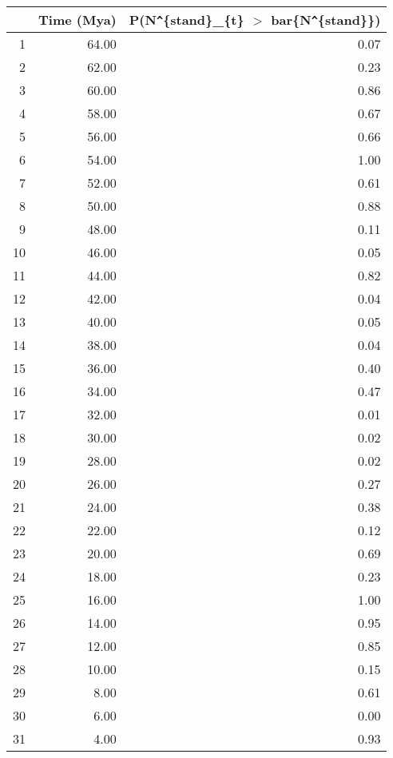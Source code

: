 \begin{table}[ht]
\centering
\begin{tabular}{rrr}
  \hline
 & Time (Mya) & P(N\verb|^|\{stand\}\_\{t\} $>$ bar\{N\verb|^|\{stand\}\}) \\ 
  \hline
1 & 64.00 & 0.07 \\ 
  2 & 62.00 & 0.23 \\ 
  3 & 60.00 & 0.86 \\ 
  4 & 58.00 & 0.67 \\ 
  5 & 56.00 & 0.66 \\ 
  6 & 54.00 & 1.00 \\ 
  7 & 52.00 & 0.61 \\ 
  8 & 50.00 & 0.88 \\ 
  9 & 48.00 & 0.11 \\ 
  10 & 46.00 & 0.05 \\ 
  11 & 44.00 & 0.82 \\ 
  12 & 42.00 & 0.04 \\ 
  13 & 40.00 & 0.05 \\ 
  14 & 38.00 & 0.04 \\ 
  15 & 36.00 & 0.40 \\ 
  16 & 34.00 & 0.47 \\ 
  17 & 32.00 & 0.01 \\ 
  18 & 30.00 & 0.02 \\ 
  19 & 28.00 & 0.02 \\ 
  20 & 26.00 & 0.27 \\ 
  21 & 24.00 & 0.38 \\ 
  22 & 22.00 & 0.12 \\ 
  23 & 20.00 & 0.69 \\ 
  24 & 18.00 & 0.23 \\ 
  25 & 16.00 & 1.00 \\ 
  26 & 14.00 & 0.95 \\ 
  27 & 12.00 & 0.85 \\ 
  28 & 10.00 & 0.15 \\ 
  29 & 8.00 & 0.61 \\ 
  30 & 6.00 & 0.00 \\ 
  31 & 4.00 & 0.93 \\ 
   \hline
\end{tabular}
\label{tab:div_peak}
\end{table}
